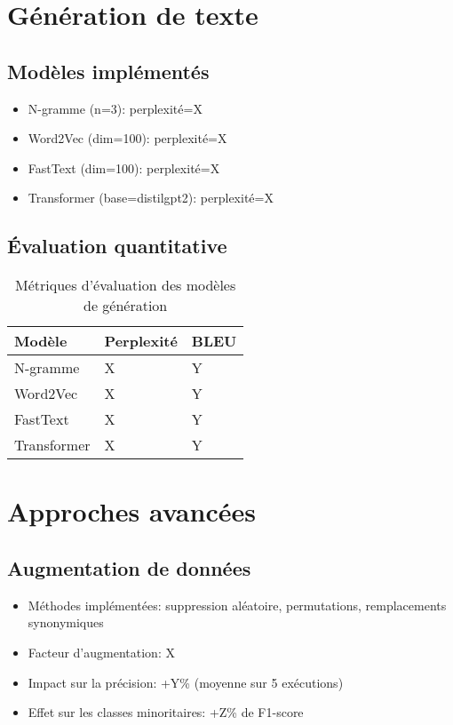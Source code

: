 \documentclass[a4paper,11pt]{article}
\begin{document}
\section{Génération de texte}
\label{sec:generation}

\subsection{Modèles implémentés}
\begin{itemize}
    \item N-gramme (n=3): perplexité=X
    \item Word2Vec (dim=100): perplexité=X
    \item FastText (dim=100): perplexité=X
    \item Transformer (base=distilgpt2): perplexité=X
\end{itemize}

\subsection{Évaluation quantitative}
\begin{table}[h]
\centering
\begin{tabular}{lll}
\toprule
\textbf{Modèle} & \textbf{Perplexité} & \textbf{BLEU} \\
\midrule
N-gramme & X & Y \\
Word2Vec & X & Y \\
FastText & X & Y \\
Transformer & X & Y \\
\bottomrule
\end{tabular}
\caption{Métriques d'évaluation des modèles de génération}
\label{tab:generation-metrics}
\end{table}

\section{Approches avancées}
\label{sec:advanced}

\subsection{Augmentation de données}
\begin{itemize}
    \item Méthodes implémentées: suppression aléatoire, permutations, remplacements synonymiques
    \item Facteur d'augmentation: X
    \item Impact sur la précision: +Y\% (moyenne sur 5 exécutions)
    \item Effet sur les classes minoritaires: +Z\% de F1-score
\end{itemize}
\end{document}
